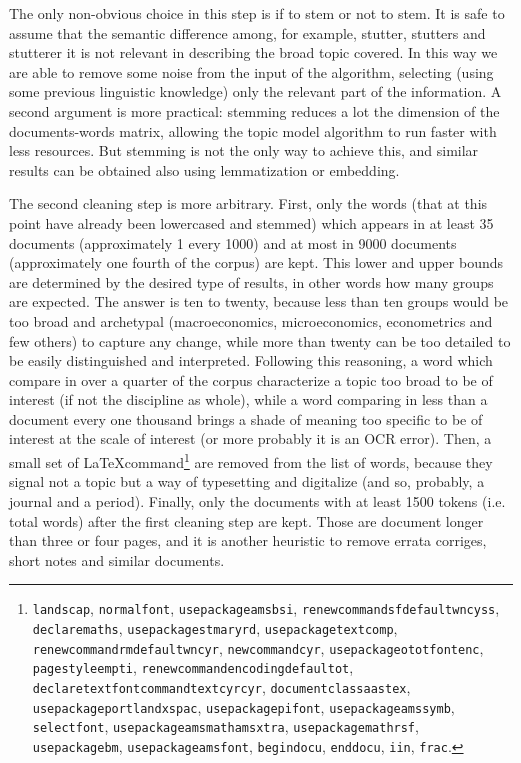\documentclass[a4paper, 11pt, headings=standardclasses, tablecaptionsbelow]{scrartcl}
\begin{document}
The only non-obvious choice in this step is if to stem or not to stem. It is safe to assume that the semantic difference among, for example, stutter, stutters and stutterer it is not relevant in describing the broad topic covered. In this way we are able to remove some noise from the input of the algorithm, selecting (using some previous linguistic knowledge) only the relevant part of the information. A second argument is more practical: stemming reduces a lot the dimension of the documents-words matrix, allowing the topic model algorithm to run faster with less resources.
But stemming is not the only way to achieve this, and similar results can be obtained also using lemmatization or embedding.

The second cleaning step is more arbitrary.
First, only the words (that at this point have already been lowercased and stemmed) which appears in at least 35 documents (approximately 1 every 1000) and at most in 9000 documents (approximately one fourth of the corpus) are kept. This lower and upper bounds are determined by the desired type of results, in other words how many groups are expected. The answer is ten to twenty, because less than ten groups would be too broad and archetypal (macroeconomics, microeconomics, econometrics and few others) to capture any change, while more than twenty can be too detailed to be easily distinguished and interpreted. Following this reasoning, a word which compare in over a quarter of the corpus characterize a topic too broad to be of interest (if not the discipline as whole), while a word comparing in less than a document every one thousand brings a shade of meaning too specific to be of interest at the scale of interest (or more probably it is an OCR error). Then, a small set of \LaTeX command\footnote{\texttt{landscap}, \texttt{normalfont}, \texttt{usepackageamsbsi}, \texttt{renewcommandsfdefaultwncyss}, \texttt{declaremaths}, \texttt{usepackagestmaryrd}, \texttt{usepackagetextcomp}, \texttt{renewcommandrmdefaultwncyr}, \texttt{newcommandcyr}, \texttt{usepackageototfontenc}, \texttt{pagestyleempti}, \texttt{renewcommandencodingdefaultot}, \texttt{declaretextfontcommandtextcyrcyr}, \texttt{documentclassaastex}, \texttt{usepackageportlandxspac}, \texttt{usepackagepifont}, \texttt{usepackageamssymb}, \texttt{selectfont}, \texttt{usepackageamsmathamsxtra}, \texttt{usepackagemathrsf}, \texttt{usepackagebm}, \texttt{usepackageamsfont}, \texttt{begindocu}, \texttt{enddocu}, \texttt{iin}, \texttt{frac}.} are removed from the list of words, because they signal not a topic but a way of typesetting and digitalize (and so, probably, a journal and a period).
Finally, only the documents with at least 1500 tokens (i.e. total words) after the first cleaning step are kept. Those are document longer than three or four pages, and it is another heuristic to remove errata corriges, short notes and similar documents.
\end{document}
